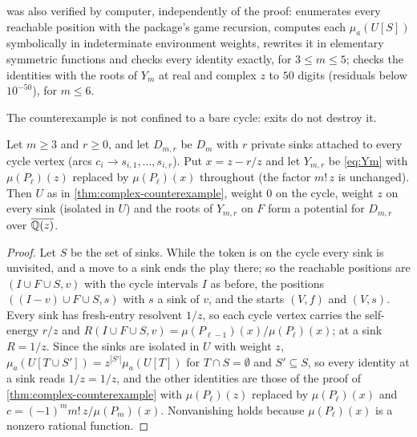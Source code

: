  was also verified by computer, independently of the proof:  enumerates every reachable position with the package's game recursion, computes each $\mu_a(U[S])$ symbolically in indeterminate environment weights, rewrites it in elementary symmetric functions and checks every identity exactly, for $3\le m\le5$;  checks the identities with the roots of $Y_m$ at real and complex $z$ to $50$ digits (residuals below $10^{-50}$), for $m\le6$.

The counterexample is not confined to a bare cycle: exits do not destroy it.

\begin{proposition}\label{prop:sinks}
Let $m\ge3$ and $r\ge0$, and let $D_{m,r}$ be $D_m$ with $r$ private sinks attached to every cycle vertex \textup{(}arcs $c_i\to s_{i,1},\dots,s_{i,r}$\textup{)}. Put $x=z-r/z$ and let $Y_{m,r}$ be \eqref{eq:Ym} with $\mu(P_\ell)(z)$ replaced by $\mu(P_\ell)(x)$ throughout \textup{(}the factor $m!\,z$ is unchanged\textup{)}. Then $U$ as in \cref{thm:complex-counterexample}, weight $0$ on the cycle, weight $z$ on every sink \textup{(}isolated in $U$\textup{)} and the roots of $Y_{m,r}$ on $F$ form a potential for $D_{m,r}$ over $\overline{\mathbb{Q}(z)}$.
\end{proposition}
\begin{proof}
Let $S$ be the set of sinks. While the token is on the cycle every sink is unvisited, and a move to a sink ends the play there; so the reachable positions are $(I\cup F\cup S,v)$ with the cycle intervals $I$ as before, the positions $((I-v)\cup F\cup S,s)$ with $s$ a sink of $v$, and the starts $(V,f)$ and $(V,s)$. Every sink has fresh-entry resolvent $1/z$, so each cycle vertex carries the self-energy $r/z$ and $R(I\cup F\cup S,v)=\mu(P_{\ell-1})(x)/\mu(P_\ell)(x)$; at a sink $R=1/z$. Since the sinks are isolated in $U$ with weight $z$, $\mu_a(U[T\cup S'])=z^{|S'|}\mu_a(U[T])$ for $T\cap S=\emptyset$ and $S'\subseteq S$, so every identity at a sink reads $1/z=1/z$, and the other identities are those of the proof of \cref{thm:complex-counterexample} with $\mu(P_\ell)(z)$ replaced by $\mu(P_\ell)(x)$ and $c=(-1)^mm!\,z/\mu(P_m)(x)$. Nonvanishing holds because $\mu(P_\ell)(x)$ is a nonzero rational function.
\end{proof}

